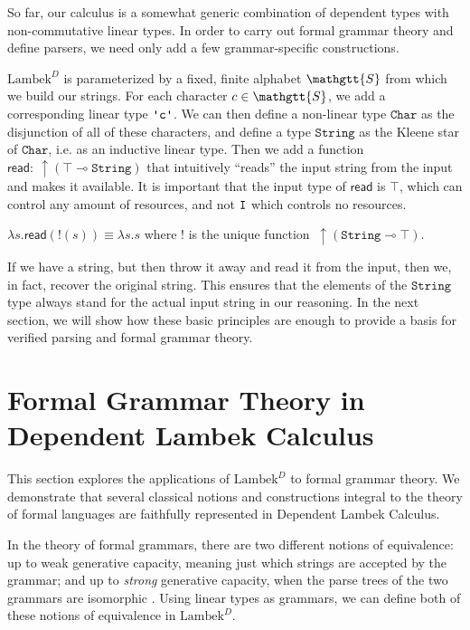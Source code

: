 \documentclass[acmsmall,nonacm]{acmart}
\renewcommand{\Sigma}{\mathgtt{S}}
\newcommand{\lto}{\multimap}
\newcommand{\CharGram}{\texttt{Char}}
\newcommand{\StringGram}{\texttt{String}}
\newcommand{\theoryname}{Dependent Lambek Calculus\xspace}
\newcommand{\theoryabbv}{$\textrm{Lambek}^D$\xspace}
\newcommand{\ltonl}[1]{~\uparrow #1}
\newcommand{\literal}[1]{\texttt{\textquotesingle#1\textquotesingle}}
\begin{document}
{So far, our calculus is a somewhat generic combination of dependent
types with non-commutative linear types. In order to carry out formal
grammar theory and define parsers, we need only add a few
grammar-specific constructions.

\theoryabbv is parameterized by a fixed, finite alphabet $\Sigma$ from which we
build our strings.  For each character $c \in \Sigma$,
we add a corresponding linear type $\literal{c}$. We can then define a
non-linear type $\CharGram$ as the disjunction of all of these characters,
and define a type $\StringGram$ as the Kleene star of $\CharGram$, i.e. as an
inductive linear type.
Then we add a function $\mathsf{read} :
\ltonl{(\top\lto \StringGram)}$ that intuitively ``reads'' the input
string from the input and makes it available. It is important that the
input type of $\mathsf{read}$ is $\top$, which can control any amount
of resources, and not $\texttt{I}$ which controls no resources.


\begin{axiom}
  \label{ax:string-top}
   $\lambda s. \mathsf{read}(!(s)) \equiv \lambda
s. s$ where $!$ is the unique function $\ltonl(\StringGram\lto \top)$.
\end{axiom}

If we have a string, but then throw it away and read
it from the input, then we, in fact, recover the original string.
This ensures that the elements of the $\StringGram$
type always stand for the actual input string in our reasoning. In the
next section, we will show how these basic principles are enough to
provide a basis for verified parsing and formal grammar theory.

\section{Formal Grammar Theory in \theoryname}
\label{sec:applications}
This section explores the applications of \theoryabbv to formal
grammar theory. We demonstrate that several classical notions and constructions
integral to the theory of formal languages are faithfully represented
in \theoryname.

In the theory of formal grammars, there are two different notions of
equivalence: up to weak generative capacity, meaning just which strings are
accepted by the grammar; and up to \emph{strong} generative capacity, when
the parse trees of the two grammars are isomorphic
\cite{chom1963}. Using linear types as grammars, we can define both of
these notions of equivalence in \theoryabbv.

}
\end{document}
